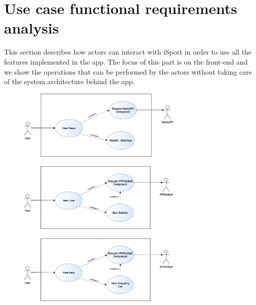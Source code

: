 \documentclass[numbers=noenddot, 12pt, a4paper, oneside]{scrbook}
\begin{document}
\chapter{Use case functional requirements analysis}
This section describes how actors can interact with iSport in order to use all the features implemented in the app. The focus of this part is on the front-end and we show the operations that can be performed by the actors without taking care of the system architecture behind the app.
\begin{figure}[H]
	\centering
	\includegraphics[width=0.7\textwidth]{images/ViewNews}
\end{figure}
\begin{figure}[H]
	\centering
	\includegraphics[width=0.7\textwidth]{images/ViewLive}
\end{figure}
\begin{figure}[H]
	\centering
	\includegraphics[width=0.7\textwidth]{images/ViewBet}
\end{figure}
\end{document}
